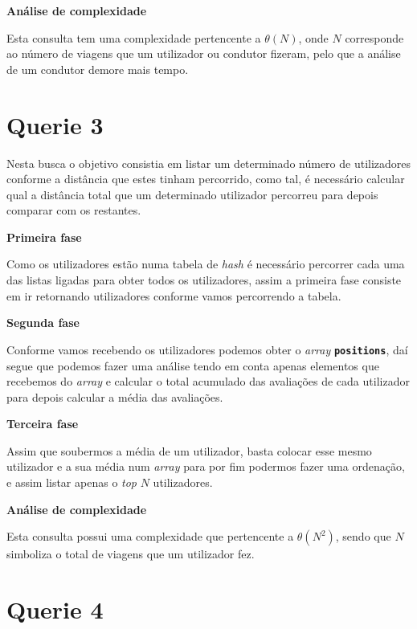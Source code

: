 \documentclass[12pt,a4paper]{report}
\begin{document}
\normalsize\textbf{Análise de complexidade }{\titlerule[0.5pt]}

Esta consulta tem uma complexidade pertencente a \(\theta(N)\), onde \(N\) corresponde ao número de viagens que um utilizador ou condutor fizeram, pelo que a análise de um condutor demore mais tempo.

\vspace{-6pt}
\section{Querie 3}

Nesta busca o objetivo consistia em listar um determinado número de utilizadores conforme a distância que estes tinham percorrido, como tal, é necessário calcular qual a distância total que um determinado utilizador percorreu para depois comparar com os restantes.

\normalsize\textbf{Primeira fase }{\titlerule[0.5pt]}

Como os utilizadores estão numa tabela de \textit{hash} é necessário percorrer cada uma das listas ligadas para obter todos os utilizadores, assim a primeira fase consiste em ir retornando utilizadores conforme vamos percorrendo a tabela.

\normalsize\textbf{Segunda fase }{\titlerule[0.5pt]}

Conforme vamos recebendo os utilizadores podemos obter o \textit{array} \textbf{\small\texttt{positions}}, daí segue que podemos fazer uma análise tendo em conta apenas elementos que recebemos do \textit{array} e calcular o total acumulado das avaliações de cada utilizador para depois calcular a média das avaliações.

\normalsize\textbf{Terceira fase }{\titlerule[0.5pt]}

Assim que soubermos a média de um utilizador, basta colocar esse mesmo utilizador e a sua média num \textit{array} para por fim podermos fazer uma ordenação, e assim listar apenas o \textit{top} \(N\) utilizadores.

\normalsize\textbf{Análise de complexidade }{\titlerule[0.5pt]}

Esta consulta possui uma complexidade que pertencente a \(\theta(N^2)\), sendo que \(N\) simboliza o total de viagens que um utilizador fez. 


\section{Querie 4}
\end{document}
